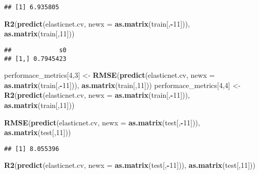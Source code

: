 \documentclass[
]{article}
\newenvironment{Shaded}{\begin{snugshade}}{\end{snugshade}}
\newcommand{\DataTypeTok}[1]{\textcolor[rgb]{0.13,0.29,0.53}{#1}}
\newcommand{\DecValTok}[1]{\textcolor[rgb]{0.00,0.00,0.81}{#1}}
\newcommand{\KeywordTok}[1]{\textcolor[rgb]{0.13,0.29,0.53}{\textbf{#1}}}
\newcommand{\NormalTok}[1]{#1}
\newcommand{\OperatorTok}[1]{\textcolor[rgb]{0.81,0.36,0.00}{\textbf{#1}}}
\newcommand{\StringTok}[1]{\textcolor[rgb]{0.31,0.60,0.02}{#1}}
\begin{document}
\begin{verbatim}
## [1] 6.935805
\end{verbatim}

\begin{Shaded}
\begin{Highlighting}[]
\KeywordTok{R2}\NormalTok{(}\KeywordTok{predict}\NormalTok{(elasticnet.cv, }\DataTypeTok{newx =} \KeywordTok{as.matrix}\NormalTok{(train[,}\OperatorTok{-}\DecValTok{11}\NormalTok{])), }\KeywordTok{as.matrix}\NormalTok{(train[,}\DecValTok{11}\NormalTok{]))}
\end{Highlighting}
\end{Shaded}

\begin{verbatim}
##             s0
## [1,] 0.7945423
\end{verbatim}

\begin{Shaded}
\begin{Highlighting}[]
\NormalTok{performace_metrics[}\DecValTok{4}\NormalTok{,}\DecValTok{3}\NormalTok{] <-}\StringTok{ }\KeywordTok{RMSE}\NormalTok{(}\KeywordTok{predict}\NormalTok{(elasticnet.cv, }\DataTypeTok{newx =} \KeywordTok{as.matrix}\NormalTok{(train[,}\OperatorTok{-}\DecValTok{11}\NormalTok{])), }\KeywordTok{as.matrix}\NormalTok{(train[,}\DecValTok{11}\NormalTok{]))}
\NormalTok{performace_metrics[}\DecValTok{4}\NormalTok{,}\DecValTok{4}\NormalTok{] <-}\StringTok{ }\KeywordTok{R2}\NormalTok{(}\KeywordTok{predict}\NormalTok{(elasticnet.cv, }\DataTypeTok{newx =} \KeywordTok{as.matrix}\NormalTok{(train[,}\OperatorTok{-}\DecValTok{11}\NormalTok{])), }\KeywordTok{as.matrix}\NormalTok{(train[,}\DecValTok{11}\NormalTok{]))}

\KeywordTok{RMSE}\NormalTok{(}\KeywordTok{predict}\NormalTok{(elasticnet.cv, }\DataTypeTok{newx =} \KeywordTok{as.matrix}\NormalTok{(test[,}\OperatorTok{-}\DecValTok{11}\NormalTok{])), }\KeywordTok{as.matrix}\NormalTok{(test[,}\DecValTok{11}\NormalTok{]))}
\end{Highlighting}
\end{Shaded}

\begin{verbatim}
## [1] 8.055396
\end{verbatim}

\begin{Shaded}
\begin{Highlighting}[]
\KeywordTok{R2}\NormalTok{(}\KeywordTok{predict}\NormalTok{(elasticnet.cv, }\DataTypeTok{newx =} \KeywordTok{as.matrix}\NormalTok{(test[,}\OperatorTok{-}\DecValTok{11}\NormalTok{])), }\KeywordTok{as.matrix}\NormalTok{(test[,}\DecValTok{11}\NormalTok{]))}
\end{Highlighting}
\end{Shaded}
\end{document}
